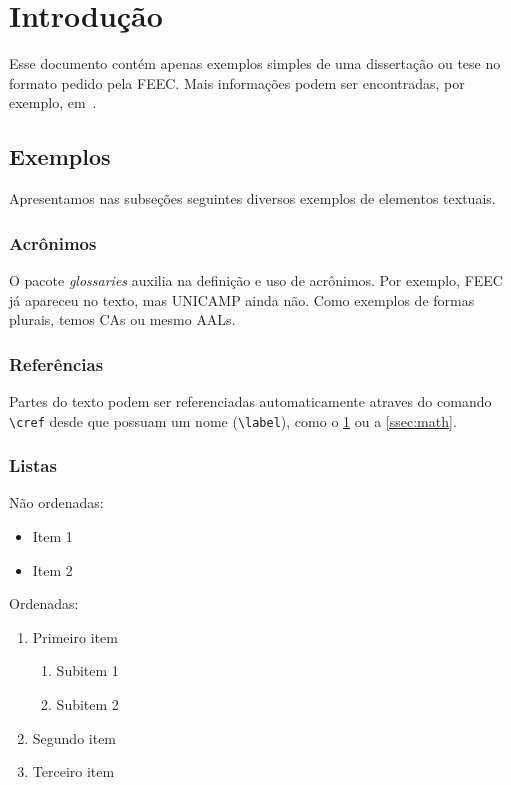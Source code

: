 \chapter{Introdução}
\label{cap:intro}

Esse documento contém apenas exemplos simples de uma dissertação ou tese no formato pedido pela \gls{FEEC}.
Mais informações podem ser encontradas, por exemplo, em~\cite{oetiker_not_2015,latex_wikibook}.


\section{Exemplos}

Apresentamos nas subseções seguintes diversos exemplos de elementos textuais.


\subsection{Acrônimos}

O pacote \emph{glossaries} auxilia na definição e uso de acrônimos.
Por exemplo, \gls{FEEC} já apareceu no texto, mas \gls{UNICAMP} ainda não.
Como exemplos de formas plurais, temos \glspl{CA} ou mesmo \glspl{AAL}.


\subsection{Referências}

Partes do texto podem ser referenciadas automaticamente atraves do comando \verb|\cref| desde que possuam um nome (\verb|\label|), como o \cref{cap:intro} ou a \cref{ssec:math}.


\subsection{Listas}

Não ordenadas:

\begin{itemize}
	\item Item 1
	\item Item 2
\end{itemize}

Ordenadas:

\begin{enumerate}
	\item Primeiro item
	\begin{enumerate}
		\item Subitem 1
		\item Subitem 2
	\end{enumerate}
	\item Segundo item
	\item Terceiro item
\end{enumerate}


